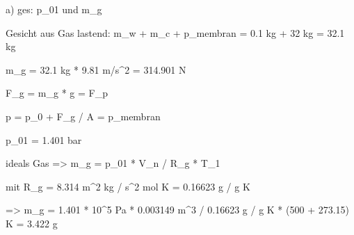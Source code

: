 a) ges: p_01 und m_g

Gesicht aus Gas lastend: m_w + m_c + p_membran = 0.1 kg + 32 kg = 32.1 kg

m_g = 32.1 kg * 9.81 m/s^2 = 314.901 N

F_g = m_g * g = F_p

p = p_0 + F_g / A = p_membran

p_01 = 1.401 bar

ideals Gas => m_g = p_01 * V_n / R_g * T_1

mit R_g = 8.314 m^2 kg / s^2 mol K = 0.16623 g / g K

=> m_g = 1.401 * 10^5 Pa * 0.003149 m^3 / 0.16623 g / g K * (500 + 273.15) K = 3.422 g